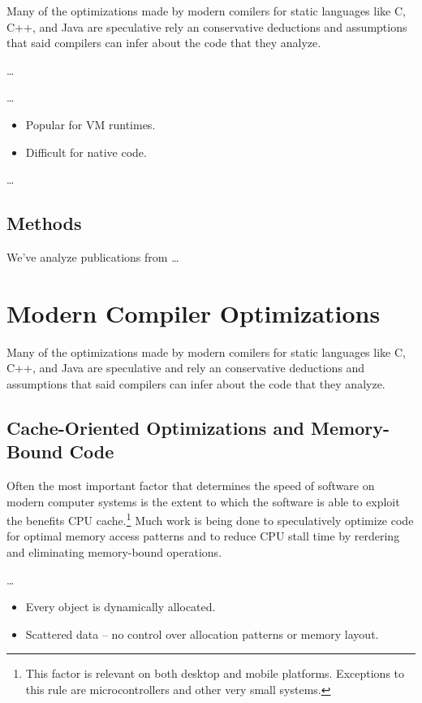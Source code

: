 \documentclass[nobib]{tufte-handout}
\newcommand{\placeholdertext}[1]{
	\noindent{\color{red}{#1}}
}
\begin{document}
Many of the optimizations made by modern comilers for static languages like C, C++, and Java are speculative rely an conservative deductions and assumptions that said compilers can infer about the code that they analyze.  


\placeholdertext{C programmers' expectations about code generation} \ldots

\placeholdertext{JIT compilation} \ldots
\begin{itemize}
\item Popular for VM runtimes.
\item Difficult for native code.
\end{itemize}


\placeholdertext{Cache latency is one of the largest factors in program speed} \ldots



\subsection{Methods}
We've analyze publications from \placeholdertext{LIST OF CONFERENCES} \ldots


\section{Modern Compiler Optimizations}
Many of the optimizations made by modern comilers for static languages like C, C++, and Java are speculative and rely an conservative deductions and assumptions that said compilers can infer about the code that they analyze.  

\subsection{Cache-Oriented Optimizations and Memory-Bound Code}
Often the most important factor that determines the speed of software on modern computer systems is the extent to which the software is able to exploit the benefits CPU cache.\footnote{This factor is relevant on both desktop and mobile platforms.  Exceptions to this rule are microcontrollers and other very small systems.}  Much work is being done to speculatively optimize code for optimal memory access patterns and to reduce CPU stall time by rerdering and eliminating memory-bound operations.

\placeholdertext{Languages with reference semantics (Java, C\#, Python) suffer poor cache performance because of their implicit object model.} \ldots \newline
\begin{itemize}
	\item Every object is dynamically allocated. 
	\item Scattered data -- no control over allocation patterns or memory layout.
\end{itemize}
\end{document}
